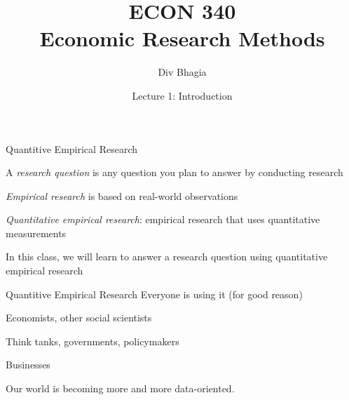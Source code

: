 \documentclass{./../div_teaching_slides}
\begin{document}
\title{ECON 340 \\ Economic Research Methods}
\author{Div Bhagia}
\date{Lecture 1: Introduction}

\begin{frame}
\maketitle
\end{frame}



\begin{frame}{Quantitive Empirical Research}
\begin{witemize}
  \item A \textit{research question} is any question you plan to answer by conducting research
  \item \textit{Empirical research} is based on real-world observations
  \item \textit{Quantitative empirical research}: empirical research that uses quantitative measurements
  \item In this class, we will learn to answer a research question using quantitative empirical research 
\end{witemize}
\end{frame}

\begin{frame}{Quantitive Empirical Research}
Everyone is using it (for good reason) \\
\begin{witemize}
\item Economists, other social scientists
\item Think tanks, governments, policymakers 
\item Businesses 
\end{witemize}
Our world is becoming more and more data-oriented.
\end{frame}
\end{document}
